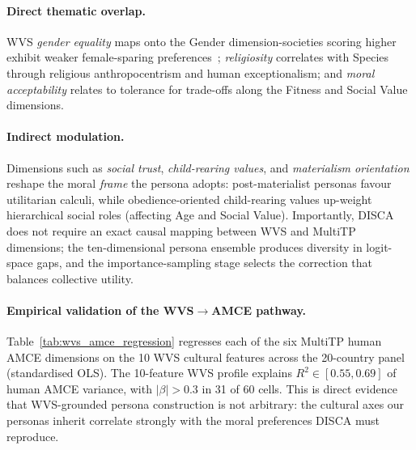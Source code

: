 \documentclass{article}
\begin{document}
\paragraph{Direct thematic overlap.}
WVS \emph{gender equality} maps onto the Gender dimension-societies scoring higher exhibit weaker female-sparing preferences~\citep{awad2018moral}; \emph{religiosity} correlates with Species through religious anthropocentrism and human exceptionalism; and \emph{moral acceptability} relates to tolerance for trade-offs along the Fitness and Social Value dimensions.

\paragraph{Indirect modulation.}
Dimensions such as \emph{social trust}, \emph{child-rearing values}, and \emph{materialism orientation} reshape the moral \emph{frame} the persona adopts: post-materialist personas favour utilitarian calculi, while obedience-oriented child-rearing values up-weight hierarchical social roles (affecting Age and Social Value). Importantly, DISCA does not require an exact causal mapping between WVS and MultiTP dimensions; the ten-dimensional persona ensemble produces diversity in logit-space gaps, and the importance-sampling stage selects the correction that balances collective utility.

\paragraph{Empirical validation of the WVS$\to$AMCE pathway.}
Table~\ref{tab:wvs_amce_regression} regresses each of the six MultiTP human AMCE dimensions on the 10 WVS cultural features across the 20-country panel (standardised OLS). The 10-feature WVS profile explains $R^2 \in [0.55, 0.69]$ of human AMCE variance, with $|\beta| > 0.3$ in 31 of 60 cells. This is direct evidence that WVS-grounded persona construction is not arbitrary: the cultural axes our personas inherit correlate strongly with the moral preferences DISCA must reproduce.
\end{document}
